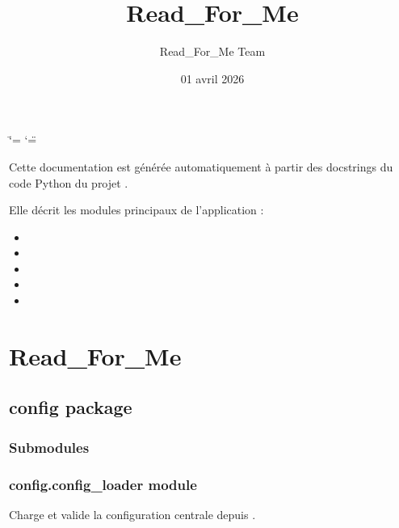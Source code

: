 \documentclass[letterpaper,10pt,french]{sphinxmanual}
\title{Read\_For\_Me}
\date{01 avril 2026}
\author{Read\_For\_Me Team}
\begin{document}
\ifdefined\shorthandoff
  \ifnum\catcode`\=\string=\active\shorthandoff{=}\fi
  \ifnum\catcode`\"=\active{}\fi
\fi

\pagestyle{empty}
\sphinxmaketitle
\pagestyle{plain}
\sphinxtableofcontents
\pagestyle{normal}
\label{\detokenize{index::doc}}


\sphinxAtStartPar
Cette documentation est générée automatiquement à partir des docstrings
du code Python du projet .

\sphinxAtStartPar
Elle décrit les modules principaux de l’application :
\begin{itemize}
\item {} 
\sphinxAtStartPar
{}

\item {} 
\sphinxAtStartPar
{}

\item {} 
\sphinxAtStartPar
{}

\item {} 
\sphinxAtStartPar
{}

\item {} 
\sphinxAtStartPar
{}

\end{itemize}

\sphinxstepscope


\chapter{Read\_For\_Me}
\label{\detokenize{api/modules:read-for-me}}\label{\detokenize{api/modules::doc}}
\sphinxstepscope


\section{config package}
\label{\detokenize{api/config:config-package}}\label{\detokenize{api/config::doc}}

\subsection{Submodules}
\label{\detokenize{api/config:submodules}}

\subsection{config.config\_loader module}
\label{\detokenize{api/config:module-config.config_loader}}\label{\detokenize{api/config:config-config-loader-module}}
\sphinxAtStartPar
Charge et valide la configuration centrale depuis .
\end{document}
